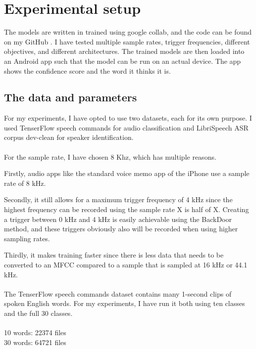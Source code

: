 \documentclass{article}
\theoremstyle{definition}
\theoremstyle{remark}
\begin{document}
\section{Experimental setup}
The models are written in trained using google collab, and the code can be found on my GitHub \cite{GH}. I have tested multiple sample rates, trigger frequencies, different objectives, and different architectures. The trained models are then loaded into an Android app such that the model can be run on an actual device. The app shows the confidence score and the word it thinks it is. 

\subsection{The data and parameters}
For my experiments, I have opted to use two datasets, each for its own purpose. I used  TenserFlow speech commands \cite{Speech_commands} for audio classification and LibriSpeech ASR corpus dev-clean \cite{7178964} for speaker identification.\\\\


For the sample rate, I have chosen 8 Khz, which has multiple reasons.

Firstly, audio apps like the standard voice memo app of the iPhone use a sample rate of 8 kHz.

Secondly, it still allows for a maximum trigger frequency of 4 kHz since the highest frequency can be recorded using the sample rate X is half of X. Creating a trigger between 0 kHz and 4 kHz is easily achievable using the BackDoor method, and these triggers obviously also will be recorded when using higher sampling rates. 

Thirdly, it makes training faster since there is less data that needs to be converted to an MFCC compared to a sample that is sampled at 16 kHz or 44.1 kHz. \\\\
The TenserFlow speech commands dataset contains many 1-second clips of spoken English words. For my experiments, I have run it both using ten classes and the full 30 classes.
\\\\
10 words: 22374 files\\
30 words: 64721 files
\\\\
\end{document}
